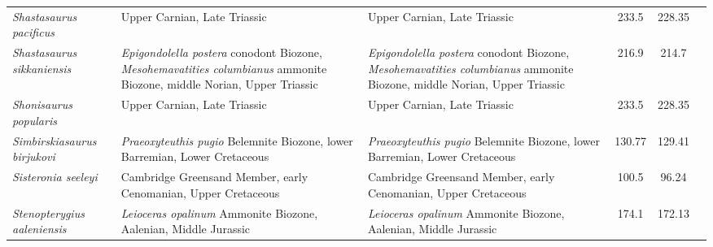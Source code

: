 \begin{longtabu}{>{\itshape}lXXSSl}
	Shastasaurus pacificus                               & Upper Carnian, Late Triassic                                                                                                       & Upper Carnian, Late Triassic                                                                                                       & 233.5                    & 228.35                   & \cite{Merriam1908} \\                    
	Shastasaurus sikkaniensis                            & \emph{Epigondolella postera} conodont Biozone, \emph{Mesohemavatities columbianus} ammonite Biozone, middle Norian, Upper Triassic & \emph{Epigondolella postera} conodont Biozone, \emph{Mesohemavatities columbianus} ammonite Biozone, middle Norian, Upper Triassic & 216.9                    & 214.7                    & \cite{Nicholls2004} \\                   
	Shonisaurus popularis                                & Upper Carnian, Late Triassic                                                                                                       & Upper Carnian, Late Triassic                                                                                                       & 233.5                    & 228.35                   & \cite{Camp1980} \\                       
	Simbirskiasaurus birjukovi                           & \emph{Praeoxyteuthis pugio} Belemnite Biozone, lower Barremian, Lower Cretaceous                                                   & \emph{Praeoxyteuthis pugio} Belemnite Biozone, lower Barremian, Lower Cretaceous                                                   & 130.77                   & 129.41                   & \cite{Fischer2014b} \\                   
	Sisteronia seeleyi                                   & Cambridge Greensand Member, early Cenomanian, Upper Cretaceous                                                                     & Cambridge Greensand Member, early Cenomanian, Upper Cretaceous                                                                     & 100.5                    & 96.24                    & \cite{Fischer2014a} \\                   
	Stenopterygius aaleniensis                           & \emph{Leioceras opalinum} Ammonite Biozone, Aalenian, Middle Jurassic                                                              & \emph{Leioceras opalinum} Ammonite Biozone, Aalenian, Middle Jurassic                                                              & 174.1                    & 172.13                   & \cite{Maxwell2012b} \\                   

\end{longtabu}
